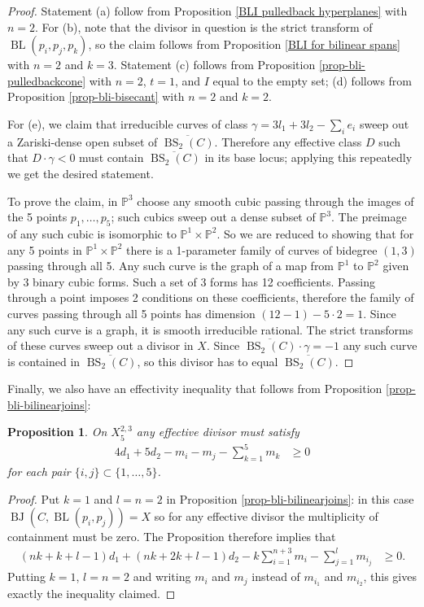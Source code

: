 \documentclass[a4paper,11pt]{article}
\newtheorem{proposition}[theorem]{Proposition}
\newcommand{\PP}{\mathbb P}
\newcommand{\BL}{\operatorname{BL}}
\newcommand{\BJ}{\operatorname{BJ}}
\newcommand{\BS}{\operatorname{BS}}
\begin{document}
\begin{proof}
Statement (a) follow from Proposition \ref{BLI pulledback hyperplanes} with $n=2$. For (b), note that the divisor in question is the strict transform of $\BL(p_i,p_j,p_k)$, so the claim follows from Proposition \ref{BLI for bilinear spans} with $n=2$ and $k=3$.  Statement (c) follows from Proposition \ref{prop-bli-pulledbackcone} with $n=2$, $t=1$, and $I$ equal to the empty set; (d) follows from Proposition \ref{prop-bli-bisecant} with $n=2$ and $k=2$.

For (e), we claim that irreducible curves of class $\gamma=3l_1+3l_2-\sum_i e_i$ sweep out a Zariski-dense open subset of $\overline{\BS_2(C)}$. Therefore any effective class $D$ such that $D \cdot \gamma <0$ must contain $\overline{\BS_2(C)}$ in its base locus; applying this repeatedly we get the desired statement. 

To prove the claim, in $\PP^3$ choose any smooth cubic passing through the images of the 5 points $p_1,\ldots,p_5$; such cubics sweep out a dense subset of $\PP^3$. The preimage of any such  cubic is isomorphic to $\PP^1 \times \PP^2$. So we are reduced to showing that for any 5 points in $\PP^1 \times \PP^2$ there is a 1-parameter family of curves of bidegree $(1,3)$ passing through all 5. Any such curve is the graph of a map from $\PP^1$ to $\PP^2$ given by 3 binary cubic forms. Such a set of 3 forms has 12 coefficients. Passing through a point imposes 2 conditions on these coefficients, therefore the family of curves passing through all 5 points has dimension $(12-1)-5\cdot2 = 1$. Since any such curve is a graph, it is smooth irreducible rational. The strict transforms of these curves sweep out a divisor in $X$. Since $\overline{\BS_2(C)} \cdot \gamma = -1$ any such curve is contained in $\overline{\BS_2(C)}$, so this divisor has to equal $\overline{\BS_2(C)}$.
\end{proof}
Finally, we also have an effectivity inequality that follows from Proposition \ref{prop-bli-bilinearjoins}:
\begin{proposition} \label{prop-bilinearjoins-x235}
On $X^{2,3}_5$ any effective divisor must satisfy
\begin{align*}
4d_1+5d_2 - m_i-m_j-\sum_{k=1}^5 m_k &\geq 0
\end{align*}
for each pair $\{i,j\} \subset \{1,\ldots,5\}$.
\end{proposition}
\begin{proof}
Put $k=1$ and $l=n=2$ in Proposition \ref{prop-bli-bilinearjoins}: in this case $\BJ(C,\BL(p_i,p_j))=X$ so for any effective divisor the multiplicity of containment must be zero. The Proposition therefore implies that
\begin{align*}
    (nk+k+l-1)d_1+(nk+2k+l-1)d_2-k\sum_{i=1}^{n+3}m_i-\sum_{j=1}^l m_{i_j} &\geq 0.
\end{align*}
Putting $k=1$, $l=n=2$ and writing $m_i$ and $m_j$ instead of $m_{i_1}$ and $m_{i_2}$, this gives exactly the inequality claimed.
\end{proof}
\end{document}
